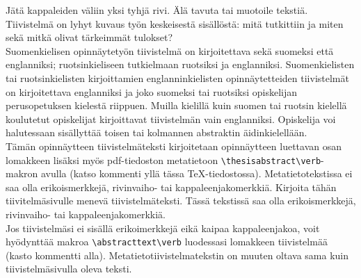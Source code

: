 \documentclass[english, 12pt, a4paper, elec, utf8, a-2b, online]{aaltothesis}
\begin{document}

\newpage
\date{19.2.2026}
\begin{abstractpage}[finnish]
  Jätä kappaleiden väliin yksi tyhjä rivi. Älä tavuta tai muotoile tekstiä.\\

  \noindent
  Tiivistelmä on lyhyt kuvaus työn keskeisestä sisällöstä: mitä tutkittiin ja 
  miten sekä mitkä olivat tärkeimmät tulokset?\\

  \noindent
  Suomenkielisen opinnäytetyön tiivistelmä on kirjoitettava sekä suomeksi että 
  englanniksi; ruotsinkieliseen tutkielmaan ruotsiksi ja englanniksi. 
  Suomenkielisten tai ruotsinkielisten kirjoittamien englanninkielisten
  opinnäytetteiden tiivistelmät on kirjoitettava englanniksi ja joko suomeksi 
  tai ruotsiksi opiskelijan perusopetuksen kielestä riippuen. Muilla kielillä 
  kuin suomen tai ruotsin kielellä koulutetut opiskelijat kirjoittavat 
  tiivistelmän vain englanniksi. Opiskelija voi halutessaan sisällyttää toisen 
  tai kolmannen abstraktin äidinkielellään.\\

  \noindent
  Tämän opinnäytteen tiivistelmäteksti kirjoitetaan opinnäytteen luettavan osan
  lomakkeen lisäksi myös pdf-tiedoston metatietoon
  \verb+\thesisabstract\verb+-makron avulla (katso kommenti yllä tässa 
  \TeX{}-tiedostossa). Metatietotekstissa ei saa olla erikoismerkkejä, 
  rivinvaiho- tai kappaleenjakomerkkiä. Kirjoita tähän tiivitelmäsivulle menevä 
  tiivistelmäteksti. Tässä tekstissä saa olla erikoismerkkejä, rivinvaiho- tai 
  kappaleenjakomerkkiä.\\

  \noindent
  Jos tiivistelmäsi ei sisällä erikoimerkkejä eikä kaipaa kappaleenjakoa, voit 
  hyödynttää makroa \verb+\abstracttext\verb+ luodessasi lomakkeen tiivistelmää 
  (kasto kommentti alla). Metatietotiivistelmatekstin on muuten oltava sama kuin 
  tiivistelmäsivulla oleva teksti.
\end{abstractpage}
\end{document}
